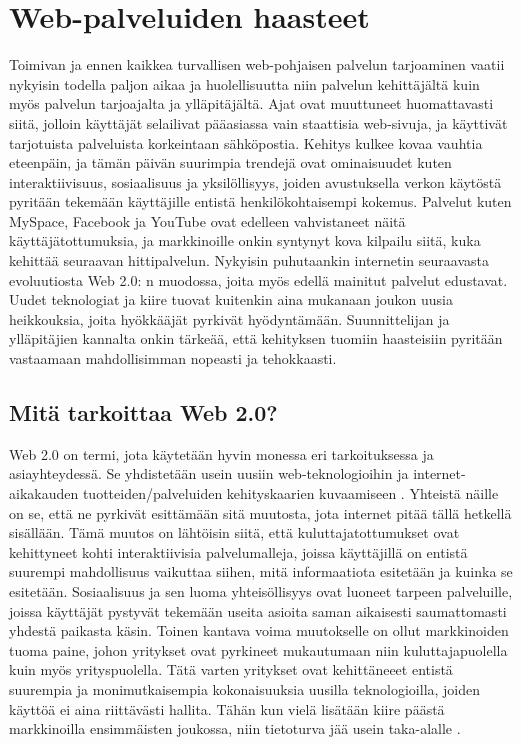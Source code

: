 
\chapter{Web-palveluiden haasteet}

Toimivan ja ennen kaikkea turvallisen web-pohjaisen palvelun tarjoaminen vaatii
nykyisin todella paljon aikaa ja huolellisuutta niin palvelun kehittäjältä kuin myös
palvelun tarjoajalta ja ylläpitäjältä. Ajat ovat muuttuneet huomattavasti siitä,
jolloin käyttäjät selailivat pääasiassa vain staattisia web-sivuja, ja käyttivät tarjotuista
palveluista korkeintaan sähköpostia. Kehitys kulkee kovaa vauhtia eteenpäin, ja
tämän päivän suurimpia trendejä ovat ominaisuudet kuten interaktiivisuus,
sosiaalisuus ja yksilöllisyys, joiden avustuksella verkon käytöstä pyritään tekemään
käyttäjille entistä henkilökohtaisempi kokemus. Palvelut kuten MySpace,
Facebook ja YouTube ovat edelleen vahvistaneet näitä käyttäjätottumuksia, ja
markkinoille onkin syntynyt kova kilpailu siitä, kuka kehittää seuraavan
hittipalvelun. Nykyisin puhutaankin internetin seuraavasta evoluutiosta Web 2.0:
n muodossa, joita myös edellä mainitut palvelut edustavat. Uudet teknologiat ja
kiire tuovat kuitenkin aina mukanaan joukon uusia heikkouksia, joita hyökkääjät
pyrkivät hyödyntämään. Suunnittelijan ja ylläpitäjien kannalta onkin tärkeää, että 
kehityksen tuomiin haasteisiin pyritään vastaamaan mahdollisimman nopeasti ja tehokkaasti.

\section{Mitä tarkoittaa Web 2.0?}

Web 2.0 on termi, jota käytetään hyvin monessa eri tarkoituksessa ja
asiayhteydessä. Se yhdistetään usein uusiin web-teknologioihin ja internet-
aikakauden tuotteiden/palveluiden kehityskaarien kuvaamiseen \cite{WEB2}. Yhteistä näille
on se, että ne pyrkivät esittämään sitä muutosta, jota internet pitää tällä
hetkellä sisällään. Tämä muutos on lähtöisin siitä, että kuluttajatottumukset
ovat kehittyneet kohti interaktiivisia palvelumalleja, joissa käyttäjillä on
entistä suurempi mahdollisuus vaikuttaa siihen, mitä informaatiota esitetään ja kuinka se esitetään.
Sosiaalisuus ja sen luoma yhteisöllisyys ovat luoneet tarpeen palveluille,
joissa käyttäjät pystyvät tekemään useita asioita saman aikaisesti saumattomasti
yhdestä paikasta käsin. Toinen kantava voima  muutokselle on ollut markkinoiden
tuoma paine, johon yritykset ovat pyrkineet mukautumaan niin kuluttajapuolella kuin myös
yrityspuolella. Tätä varten yritykset ovat kehittäneeet entistä suurempia ja 
monimutkaisempia kokonaisuuksia uusilla teknologioilla, joiden käyttöä ei aina riittävästi hallita. 
Tähän kun vielä lisätään kiire päästä markkinoilla ensimmäisten
joukossa, niin tietoturva jää usein taka-alalle \cite{WEB2b}.

